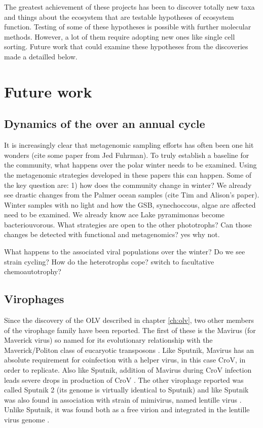 The greatest achievement of these projects has been to discover totally new taxa and things about the ecosystem that are testable hypotheses of ecosystem function.
Testing of some of these hypotheses is possible with further molecular methods.
However, a lot of them require adopting new ones like single cell sorting.
Future work that could examine these hypotheses from the discoveries made a detailled below.


\section{Future work}
\subsection{Dynamics of the over an annual cycle}
It is increasingly clear that metagenomic sampling efforts has often been one hit wonders (cite some paper from Jed Fuhrman).
To truly establish a baseline for the community, what happens over the polar winter needs to be examined.
Using the metagenomic strategies developed in these papers this can happen.
Some of the key question are:
1) how does the community change in winter?
We already see drastic changes from the Palmer ocean samples (cite Tim and Alison's paper). 
Winter samples with no light and how the GSB, synechoccous, algae are affected need to be examined.
We already know ace Lake pyramimonas become bacteriouvorous. 
What strategies are open to the other phototrophs?
Can those changes be detected with functional and metagenomics? yes why not.

What happens to the associated viral populations over the winter?
Do we see strain cycling?
How do the heterotrophs cope? switch to facultative chemoautotrophy?

\subsection{Virophages}
Since the discovery of the \ac{OLV} \cite{Yau2011} described in chapter \ref{ch:olv}, two other members of the virophage family have been reported.
The first of these is the Mavirus (for Maverick virus) so named for its evolutionary relationship with the Maverick/Politon class of eucaryotic transposons \cite{Fischer2011}.
Like Sputnik, Mavirus has an absolute requirement for coinfection with a helper virus, in this case \ac{CroV}, in order to replicate.
Also like Sputnik, addition of Mavirus during \ac{CroV} infection leads severe drops in production of \ac{CroV} \cite{Fischer2011}.
The other virophage reported was called Sputnik 2 (its genome is virtually identical to Sputnik) and like Sputnik was also found in association with strain of mimivirus, named lentille virus \cite{Desnues2012}.
Unlike Sputnik, it was found both as a free virion and integrated in the lentille virus genome \cite{Desnues2012}.


